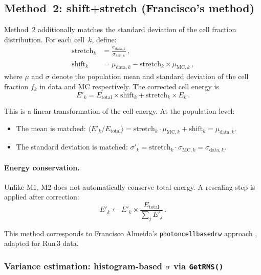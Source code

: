 \documentclass[11pt,a4paper]{article}
\newcommand{\Etot}{\ensuremath{E_{\mathrm{total}}}}
\begin{document}
\subsection{Method~2: shift+stretch (Francisco's method)}
\label{sec:m2}

Method~2 additionally matches the standard deviation of the cell
fraction distribution.  For each cell~$k$, define:
\begin{align}
  \text{stretch}_k &= \frac{\sigma_{\text{data},k}}{\sigma_{\text{MC},k}}
  \,,\label{eq:m2-stretch}\\
  \text{shift}_k &= \mu_{\text{data},k}
                   - \text{stretch}_k \times \mu_{\text{MC},k}
  \,,\label{eq:m2-shift}
\end{align}
where $\mu$ and $\sigma$ denote the population mean and standard
deviation of the cell fraction $f_k$ in data and MC respectively.
The corrected cell energy is
\begin{equation}
  E'_k = \Etot \times \text{shift}_k
       + \text{stretch}_k \times E_k \,.
  \label{eq:m2-apply}
\end{equation}

This is a linear transformation of the cell energy.  At the population
level:
\begin{itemize}
  \item The mean is matched:
    $\langle E'_k / \Etot \rangle = \text{stretch}_k \cdot \mu_{\text{MC},k}
    + \text{shift}_k = \mu_{\text{data},k}$.
  \item The standard deviation is matched:
    $\sigma'_k = \text{stretch}_k \cdot \sigma_{\text{MC},k}
    = \sigma_{\text{data},k}$.
\end{itemize}

\paragraph{Energy conservation.}
Unlike M1, M2 does not automatically conserve total energy.  A
rescaling step is applied after correction:
\begin{equation}
  E'_k \leftarrow E'_k \times \frac{\Etot}{\sum_{j} E'_j} \,.
  \label{eq:m2-rescale}
\end{equation}

This method corresponds to Francisco Almeida's
\texttt{photoncellbasedrw} approach \cite{francisco}, adapted for
Run\,3 data.


\subsubsection{Variance estimation: histogram-based $\sigma$ via \texttt{GetRMS()}}
\label{sec:m2-getrms}
\end{document}
